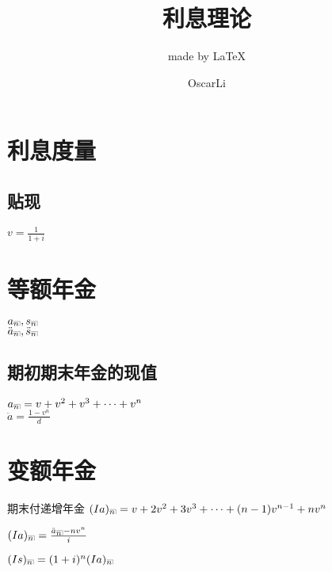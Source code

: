 \documentclass[cn,11pt,chinese,black]{elegantbook}
\title{利息理论}
\subtitle{made by \LaTeX{} }
\author{OscarLi}
\institute{西南交大数学学院}
\begin{document}
\def\angles#1{{%
		\vbox{\hrule height .2pt
			\kern 1pt
			\hbox{$\scriptstyle {#1}\kern 1pt$}%
		}\kern-.05pt \vrule width .2pt
}}
%
\maketitle
	\chapter{利息度量}
	
	\section{贴现}
	$v=\frac{1}{1+i}$
	\chapter{等额年金}
	\noindent$a_{\angles{n}},s_{\angles{n}}$\\	$\ddot{a}_{\angles{n}},\ddot{s}_{\angles{n}}$
	\section{期初期末年金的现值}
	$a_{\angles{n}}=v+v^2+v^3+\dots+v^n$
\\ $\ddot{a}=\frac{1-v^n}{d}$
\chapter{变额年金}
\begin{definition}{期末付递增年金}
	$(Ia)_{\angles{n}}=v+2 v^{2}+3 v^{3}+\cdots+(n-1) v^{n-1}+n v^{n}$
\end{definition}
\begin{remark}
	$(Ia)_{\angles{n}}=\frac{\ddot{a}_{\angles{n}}-n v^{n}}{i}$
\end{remark}
$(Is)_{\angles{n}}=(1+i)^n(Ia)_{\angles{n}}$
\end{document}
